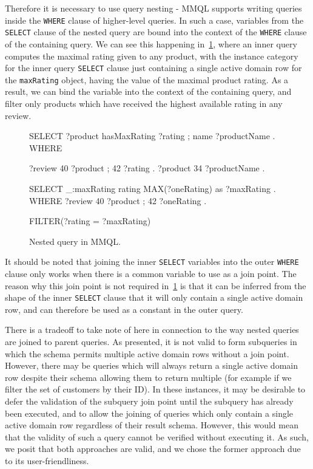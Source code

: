 Therefore it is necessary to use query nesting - MMQL supports writing queries inside the \texttt{WHERE} clause of higher-level queries.
In such a case, variables from the \texttt{SELECT} clause of the nested query are bound into the context of the \texttt{WHERE} clause of the containing query.
We can see this happening in~\cref{mmql:figure:nestedquery}, where an inner query computes the maximal rating given to any product, with the instance category for the inner query \texttt{SELECT} clause just containing a single active domain row for the \texttt{maxRating} object, having the value of the maximal product rating.
As a result, we can bind the variable into the context of the containing query, and filter only products which have received the highest available rating in any review.

\begin{figure}[ht]
\begin{code}
SELECT {
    ?product hasMaxRating ?rating ;
        name ?productName .
}
WHERE {
    ?review 40 ?product ;
        42 ?rating .
    ?product 34 ?productName .

    {
        SELECT {
            _:maxRating rating MAX(?oneRating) as ?maxRating .
        }
        WHERE {
            ?review 40 ?product ;
                42 ?oneRating .
        }
    }

    FILTER(?rating = ?maxRating)
}
\end{code}
\caption{Nested query in MMQL.}\label{mmql:figure:nestedquery}
\end{figure}

It should be noted that joining the inner \texttt{SELECT} variables into the outer \texttt{WHERE} clause only works when there is a common variable to use as a join point.
The reason why this join point is not required in~\cref{mmql:figure:nestedquery} is that it can be inferred from the shape of the inner \texttt{SELECT} clause that it will only contain a single active domain row, and can therefore be used as a constant in the outer query.

There is a tradeoff to take note of here in connection to the way nested queries are joined to parent queries.
As presented, it is not valid to form subqueries in which the schema permits multiple active domain rows without a join point.
However, there may be queries which will always return a single active domain row despite their schema allowing them to return multiple (for example if we filter the set of customers by their ID).
In these instances, it may be desirable to defer the validation of the subquery join point until the subquery has already been executed, and to allow the joining of queries which only contain a single active domain row regardless of their result schema.
However, this would mean that the validity of such a query cannot be verified without executing it.
As such, we posit that both approaches are valid, and we chose the former approach due to its user-friendliness.


